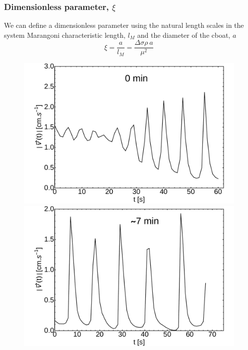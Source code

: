 \documentclass[journal=langd5, manuscript=article, layout=twocolumn]{achemso}
\begin{document}
\subsubsection{Dimensionless parameter, $\xi$}
We can define a dimensionless parameter using the natural length scales in the system Marangoni characteristic length, $l_{M}$ and the diameter of the cboat, $a$
\begin{equation}
\xi = \frac{a}{l_{M}} = \frac{\Delta\sigma\rho\ a}{\mu^{2}}
\end{equation}
\begin{figure}[ht]
    \centering
	\begin{minipage}[c]{0.3\linewidth}
		\centering
		\includegraphics[width=\textwidth]{uvst_65dypcm_a.pdf}
	\end{minipage}
	\begin{minipage}[c]{0.3\linewidth}
		\centering
		\includegraphics[width=\textwidth]{uvst_65dypcm_b.pdf}

\end{minipage}
\end{figure}
\end{document}

